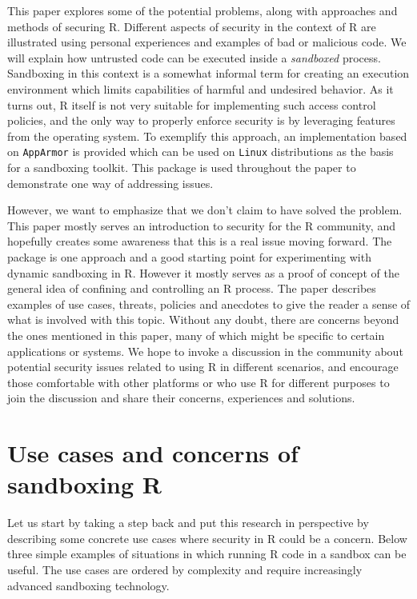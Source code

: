 \documentclass{jss}
\newcommand{\R}{\textsf{R}\xspace}
\newcommand{\AppArmor}{\texttt{AppArmor}\xspace}
\newcommand{\RAppArmor}{\pkg{RAppArmor}\xspace}
\newcommand{\Linux}{\texttt{Linux}\xspace}
\begin{document}
This paper explores some of the potential problems, along with approaches and
methods of securing \R. Different aspects of security in the context of \R are
illustrated using personal experiences and examples of bad or malicious code. We
will explain how untrusted code can be executed inside a \emph{sandboxed}
process. Sandboxing in this context is a somewhat informal term for creating an
execution environment which limits capabilities of harmful and undesired
behavior. As it turns out, \R itself is not very suitable for implementing such
access control policies, and the only way to properly enforce security is by
leveraging features from the operating system. To exemplify this approach, an
implementation based on \AppArmor is provided which can be used on \Linux
distributions as the basis for a sandboxing toolkit. This package is used
throughout the paper to demonstrate one way of addressing issues.

However, we want to emphasize that we don't claim to have solved the problem.
This paper mostly serves an introduction to security for the \R community, and
hopefully creates some awareness that this is a real issue moving forward. The
\RAppArmor package is one approach and a good starting point for experimenting
with dynamic sandboxing in \R. However it mostly serves as a proof of concept of
the general idea of confining and controlling an \R process. The paper describes
examples of use cases, threats, policies and anecdotes to give the reader a
sense of what is involved with this topic. Without any doubt, there are concerns
beyond the ones mentioned in this paper, many of which might be specific to
certain applications or systems. We hope to invoke a discussion in the community about
potential security issues related to using \R in different scenarios, and
encourage those comfortable with other platforms or who use \R for different
purposes to join the discussion and share their concerns, experiences and
solutions.

\section[Use cases and concerns of sandboxing R]{Use cases and concerns of
sandboxing \R}

Let us start by taking a step back and put this research in perspective by
describing some concrete use cases where security in \R could be a concern.
Below three simple examples of situations in which running \R code in a sandbox
can be useful. The use cases are ordered by complexity and require increasingly
advanced sandboxing technology.
\end{document}
